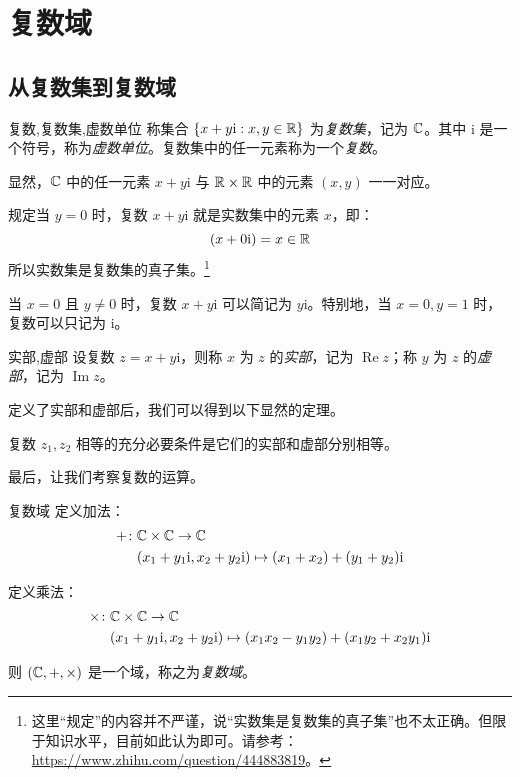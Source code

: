
\section{复数域}

\subsection{从复数集到复数域}

\begin{definition}{复数,复数集,虚数单位}
	称集合 $\{x + y \mathrm i: x, y \in \mathbb R\}$ 为\emph{复数集}，记为 $\mathbb C$。其中 $\mathrm i$ 是一个符号，称为\emph{虚数单位}。复数集中的任一元素称为一个\emph{复数}。
\end{definition}

显然，$\mathbb C$ 中的任一元素 $x + y \mathrm i$ 与 $\mathbb R \times \mathbb R$ 中的元素 $(x, y)$ 一一对应。

规定当 $y = 0$ 时，复数 $x + y \mathrm i$ 就是实数集中的元素 $x$，即：
$$
(x + 0 \mathrm i) = x \in \mathbb R
$$
所以实数集是复数集的真子集。\footnote{这里“规定”的内容并不严谨，说“实数集是复数集的真子集”也不太正确。但限于知识水平，目前如此认为即可。请参考：\url{https://www.zhihu.com/question/444883819}。}

当 $x = 0$ 且 $y \ne 0$ 时，复数 $x + y \mathrm i$ 可以简记为 $y \mathrm i$。特别地，当 $x = 0, y = 1$ 时，复数可以只记为 $\mathrm i$。

\begin{definition}{实部,虚部}
	设复数 $z = x + y \mathrm i$，则称 $x$ 为 $z$ 的\emph{实部}，记为 $\operatorname{Re} z$；称 $y$ 为 $z$ 的\emph{虚部}，记为 $\operatorname{Im} z$。
\end{definition}

定义了实部和虚部后，我们可以得到以下显然的定理。

\begin{theorem}[复数相等]
	复数 $z_1, z_2$ 相等的充分必要条件是它们的实部和虚部分别相等。
\end{theorem}

最后，让我们考察复数的运算。

\begin{definition}{复数域}
	定义加法：
	$$
	\begin{aligned}
		{+} \colon & \mathbb C \times \mathbb C \to \mathbb C
		\\&
		(x_1 + y_1 \mathrm i, x_2 + y_2 \mathrm i) \mapsto (x_1 + x_2) + (y_1 + y_2) \mathrm i
	\end{aligned}
	$$

	定义乘法：
	$$
	\begin{aligned}
		{\times} \colon & \mathbb C \times \mathbb C \to \mathbb C
		\\&
		(x_1 + y_1 \mathrm i, x_2 + y_2 \mathrm i) \mapsto (x_1 x_2 - y_1 y_2) + (x_1 y_2 + x_2 y_1) \mathrm i
	\end{aligned}
	$$

	则 $(\mathbb C, {+}, {\times})$ 是一个域，称之为\emph{复数域}。
\end{definition}

